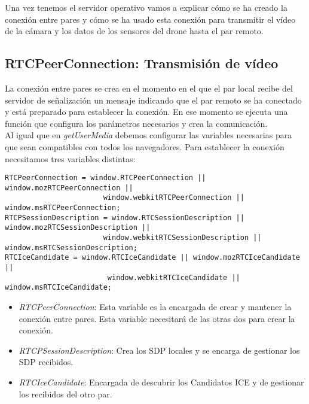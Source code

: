 Una vez tenemos el servidor operativo vamos a explicar cómo se ha creado la conexión entre pares y cómo se ha usado esta conexión para transmitir el vídeo de la cámara y los datos de los sensores del drone hasta el par remoto.\\

\subsection{RTCPeerConnection: Transmisión de vídeo}\label{subsec:transmisionvideo}

La conexión entre pares se crea en el momento en el que el par local recibe del servidor de señalización un mensaje indicando que el par remoto se ha conectado y está preparado para establecer la conexión. En ese momento se ejecuta una función que configura los parámetros necesarios y  crea la comunicación.\\

Al igual que en \emph{getUserMedia} debemos configurar las variables necesarias para que sean compatibles con todos los navegadores. Para establecer la conexión necesitamos tres variables distintas:\\


\begin{lstlisting}[caption=Variables WebRTC]
RTCPeerConnection = window.RTCPeerConnection || window.mozRTCPeerConnection || 
                       window.webkitRTCPeerConnection || window.msRTCPeerConnection;
RTCPSessionDescription = window.RTCSessionDescription || window.mozRTCSessionDescription ||
                       window.webkitRTCSessionDescription || window.msRTCSessionDescription;
RTCIceCandidate = window.RTCIceCandidate || window.mozRTCIceCandidate ||
                        window.webkitRTCIceCandidate || window.msRTCIceCandidate;
\end{lstlisting}


\begin{itemize}
\item \emph{RTCPeerConnection}: Esta variable es la encargada de crear y mantener la conexión entre pares. Esta variable necesitará de las otras dos para crear la conexión.
\item \emph{RTCPSessionDescription}: Crea los SDP locales y se encarga de gestionar los SDP recibidos.
\item \emph{RTCIceCandidate}: Encargada de descubrir los Candidatos ICE y de gestionar los recibidos del otro par.
\end{itemize}


